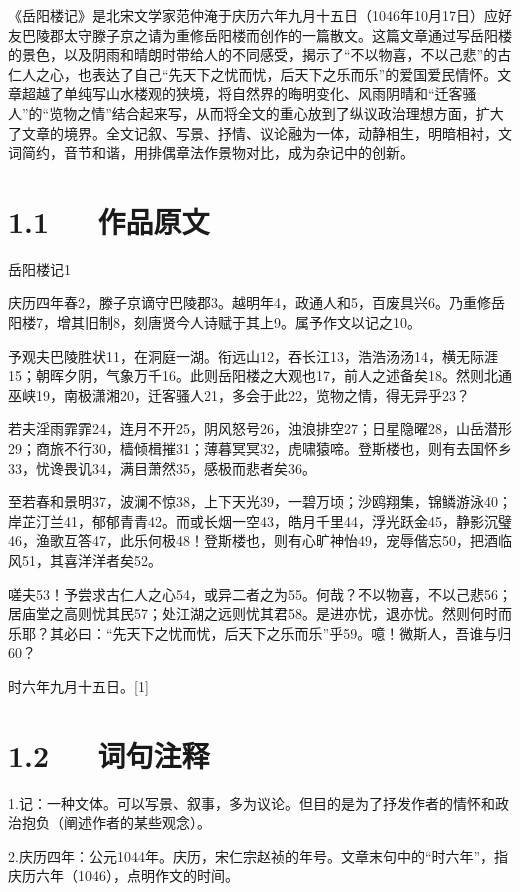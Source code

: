 \documentclass[letterpaper,12pt,english]{sphinxmanual}
\begin{document}
《岳阳楼记》是北宋文学家范仲淹于庆历六年九月十五日（1046年10月17日）应好友巴陵郡太守滕子京之请为重修岳阳楼而创作的一篇散文。这篇文章通过写岳阳楼的景色，以及阴雨和晴朗时带给人的不同感受，揭示了“不以物喜，不以己悲”的古仁人之心，也表达了自己“先天下之忧而忧，后天下之乐而乐”的爱国爱民情怀。文章超越了单纯写山水楼观的狭境，将自然界的晦明变化、风雨阴晴和“迁客骚人”的“览物之情”结合起来写，从而将全文的重心放到了纵议政治理想方面，扩大了文章的境界。全文记叙、写景、抒情、议论融为一体，动静相生，明暗相衬，文词简约，音节和谐，用排偶章法作景物对比，成为杂记中的创新。


\section{1.1   作品原文}
\label{\detokenize{p01_u6563_u6587/_u8303_u4ef2_u6df9-_u5cb3_u9633_u697c_u8bb0:id3}}
岳阳楼记1

庆历四年春2，滕子京谪守巴陵郡3。越明年4，政通人和5，百废具兴6。乃重修岳阳楼7，增其旧制8，刻唐贤今人诗赋于其上9。属予作文以记之10。

予观夫巴陵胜状11，在洞庭一湖。衔远山12，吞长江13，浩浩汤汤14，横无际涯15；朝晖夕阴，气象万千16。此则岳阳楼之大观也17，前人之述备矣18。然则北通巫峡19，南极潇湘20，迁客骚人21，多会于此22，览物之情，得无异乎23？

若夫淫雨霏霏24，连月不开25，阴风怒号26，浊浪排空27；日星隐曜28，山岳潜形29；商旅不行30，樯倾楫摧31；薄暮冥冥32，虎啸猿啼。登斯楼也，则有去国怀乡33，忧谗畏讥34，满目萧然35，感极而悲者矣36。

至若春和景明37，波澜不惊38，上下天光39，一碧万顷；沙鸥翔集，锦鳞游泳40；岸芷汀兰41，郁郁青青42。而或长烟一空43，皓月千里44，浮光跃金45，静影沉璧46，渔歌互答47，此乐何极48！登斯楼也，则有心旷神怡49，宠辱偕忘50，把酒临风51，其喜洋洋者矣52。

嗟夫53！予尝求古仁人之心54，或异二者之为55。何哉？不以物喜，不以己悲56；居庙堂之高则忧其民57；处江湖之远则忧其君58。是进亦忧，退亦忧。然则何时而乐耶？其必曰：“先天下之忧而忧，后天下之乐而乐”乎59。噫！微斯人，吾谁与归60？

时六年九月十五日。{[}1{]}


\section{1.2   词句注释}
\label{\detokenize{p01_u6563_u6587/_u8303_u4ef2_u6df9-_u5cb3_u9633_u697c_u8bb0:id4}}
1.记：一种文体。可以写景、叙事，多为议论。但目的是为了抒发作者的情怀和政治抱负（阐述作者的某些观念）。

2.庆历四年：公元1044年。庆历，宋仁宗赵祯的年号。文章末句中的“时六年”，指庆历六年（1046），点明作文的时间。
\end{document}
